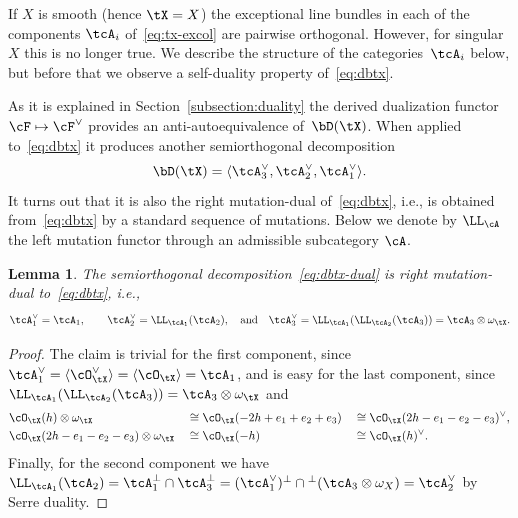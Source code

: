 \documentclass[11pt]{amsart}
\theoremstyle{plain}
\newtheorem{lemma}[theorem]{Lemma}
\theoremstyle{definition}
\theoremstyle{remark}
\begin{document}
If $X$ is smooth (hence $\tX = X$) the exceptional line bundles in each of the components $\tcA_i$ of~\eqref{eq:tx-excol} are pairwise orthogonal.
However, for singular $X$ this is no longer true.
We describe the structure of the categories~$\tcA_i$ below, but before that we observe a self-duality property of~\eqref{eq:dbtx}.

As it is explained in Section~\ref{subsection:duality} the derived dualization functor $\cF \mapsto \cF^\vee$ 
provides an anti-autoequiva\-lence of~$\bD(\tX)$. 
When applied to~\eqref{eq:dbtx} it produces another semiorthogonal decomposition
\begin{equation}\label{eq:dbtx-dual}
\bD(\tX) = \langle \tcA_3^\vee, \tcA_2^\vee, \tcA_1^\vee \rangle.
\end{equation} 
It turns out that it is also the right mutation-dual of~\eqref{eq:dbtx}, i.e., is obtained from~\eqref{eq:dbtx} by a standard sequence of mutations.
Below we denote by $\LL_\cA$ the left mutation functor through an admissible subcategory $\cA$.

\begin{lemma}\label{lemma:dual-sod-tx}
The semiorthogonal decomposition~\eqref{eq:dbtx-dual} is right mutation-dual to~\eqref{eq:dbtx}, i.e., 
\begin{equation*}
\tcA_1^\vee = \tcA_1,
\qquad
\tcA_2^\vee = \LL_{\tcA_1}(\tcA_2),
\quad\text{and}\quad 
\tcA_3^\vee = \LL_{\tcA_1}(\LL_{\tcA_2}(\tcA_3)) = \tcA_3 \otimes \omega_\tX.
\end{equation*}
\end{lemma}
\begin{proof}
The claim is trivial for the first component, since $\tcA_1^\vee  = \langle \cO_\tX^\vee  \rangle = \langle \cO_\tX \rangle = \tcA_1$,
and is easy for the last component, since $\LL_{\tcA_1}(\LL_{\tcA_2}(\tcA_3)) = \tcA_3  \otimes \omega_\tX$ and
\begin{equation}\label{eq:ce3-dual}
\begin{aligned}
& \cO_\tX(h) \otimes \omega_\tX && \cong \cO_\tX(-2h + e_1 + e_2 + e_3) && \cong \cO_\tX(2h - e_1 - e_2 - e_3)^\vee,\\
& \cO_\tX(2h - e_1 - e_2 - e_3) \otimes \omega_\tX && \cong \cO_\tX(-h) && \cong \cO_\tX(h)^\vee.
\end{aligned}
\end{equation} 
Finally, for the second component we have 
$\LL_{\tcA_1}(\tcA_2) = \tcA_1^\perp \cap \tcA_3^\perp = (\tcA_1^\vee)^\perp \cap  {}^\perp(\tcA_3 \otimes \omega_X) = \tcA_2^\vee$
by Serre duality.
\end{proof}
\end{document}
